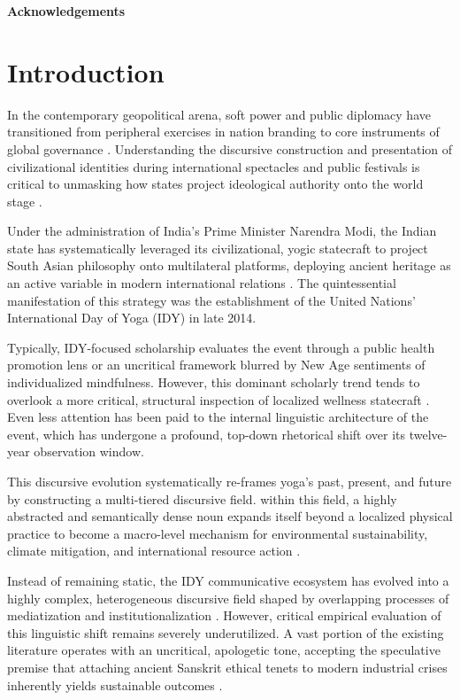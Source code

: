 \documentclass[11pt]{article}
\begin{document}
{\bfseries Acknowledgements}



\newpage

\section{Introduction}
In the contemporary geopolitical arena, soft power and public diplomacy have transitioned from peripheral exercises in nation branding to core instruments of global governance \cite{merkel2015,mokdad2025}. Understanding the discursive construction and presentation of civilizational identities during international spectacles and public festivals is critical to unmasking how states project ideological authority onto the world stage \cite{merkel2015}.

Under the administration of India's Prime Minister Narendra Modi, the Indian state has systematically leveraged its civilizational, yogic statecraft to project South Asian philosophy onto multilateral platforms, deploying ancient heritage as an active variable in modern international relations \cite{chandra2026}. The quintessential manifestation of this strategy was the establishment of the United Nations' International Day of Yoga (IDY) in late 2014.

Typically, IDY-focused scholarship evaluates the event through a public health promotion lens or an uncritical framework blurred by New Age sentiments of individualized mindfulness. However, this dominant scholarly trend tends to overlook a more critical, structural inspection of localized wellness statecraft \cite{otto2025}. Even less attention has been paid to the internal linguistic architecture of the event, which has undergone a profound, top-down rhetorical shift over its twelve-year observation window.

This discursive evolution systematically re-frames yoga's past, present, and future by constructing a multi-tiered discursive field. within this field, a highly abstracted and semantically dense noun expands itself beyond a localized physical practice to become a macro-level mechanism for environmental sustainability, climate mitigation, and international resource action \cite{bhagwat2019}.

Instead of remaining static, the IDY communicative ecosystem has evolved into a highly complex, heterogeneous discursive field shaped by overlapping processes of mediatization and institutionalization \cite{hjarvard2008}. However, critical empirical evaluation of this linguistic shift remains severely underutilized. A vast portion of the existing literature operates with an uncritical, apologetic tone, accepting the speculative premise that attaching ancient Sanskrit ethical tenets to modern industrial crises inherently yields sustainable outcomes \cite{jagannathan2026,kamal2024yoga,sadineni2024reimagining}.
\end{document}
